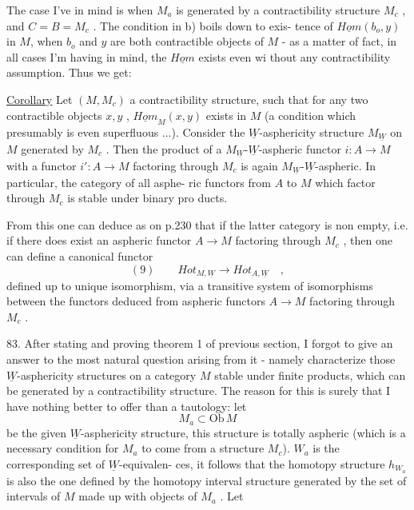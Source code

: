 
The case I've in mind is when $M_a$ is generated by a contractibility
structure $M_c$ , and $C=B = M_c$ . The condition in b) boils down to exis-%
tence of $\underline{Hom}(b_o,y)$ in $M$, when $b_o$ and $y$ are both contractible objects of $M$
- as a matter of fact, in all cases I'm having in mind,  the $\underline{Hom}$
exists even wi thout any contractibility assumption. Thus we get:

\uline{Corollary} Let $(M,M_c)$ a contractibility structure, such that for any
two contractible objects $x,y$ , $\underline{Hom}_M(x,y)$ exists in $M$ (a condition which
presumably is even superfluous ...). Consider the $\underline{W}$-asphericity structure
$M_{\underline{W}}$ on $M$ generated by $M_c$ . Then the product of a $M_{\underline{W}}$-$\underline{W}$-aspheric functor
$i: A \longrightarrow M$ with a functor $i' : A \longrightarrow M$ factoring through $M_c$ is again
$M_{\underline{W}}$-$\underline{W}$-aspheric. In particular, the category  of all asphe-%
ric functors from $A$ to $M$ which factor through $M_c$ is stable under binary pro
\hand{-}ducts.

From this one can deduce as on p.230 that if the latter category is
non empty, i.e. if there does exist an aspheric functor $A\to M$ factoring
through $M_c$ , then one can define a canonical functor
\[ (9) \qquad Hot_{M,\underline{W}} \longrightarrow Hot_{A,\underline{W}} \quad , \]
defined up to unique isomorphism, via a transitive system of isomorphisms
between the functors deduced from aspheric functors $A \to M$ factoring
through $M_c$ .

83. After stating and proving theorem 1 of previous section, I forgot
to give an answer to the most natural question arising from it - namely
 characterize those $\underline{W}$-asphericity structures on a category $M$ stable under
finite products, which can be generated by a contractibility structure.
The reason for this is surely that I have nothing better to offer than a
tautology: let
\[ M_a \subset \mathrm{Ob}\, M \]
be the given $\underline{W}$-asphericity structure,   this
structure is totally aspheric (which is a necessary condition for $M_a$ to
come from a structure $M_c$).  $W_a$ is the corresponding set of $\underline{W}$-equivalen-%
ces, it follows that the homotopy structure $h_{W_a}$ is also the one defined
by the homotopy interval structure  generated by the set  of intervals of $M$
made up with objects of $M_a$ . Let

